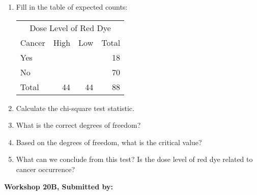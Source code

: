 \documentclass[11pt]{book}\usepackage[]{graphicx}\usepackage[]{color}
\begin{document}
\begin{exercises}
\begin{exercise}
\begin{enumerate}
  \item Fill in the table of expected counts:

\begin{center}
\begin{tabular}{@{} l rrr @{}} \hline
  \multicolumn{4}{c}{Dose Level of Red Dye} \\
Cancer&	High&	Low&	Total \\ \hline
Yes&	&	&	18 \\
No&	&	&	70 \\ \hline
Total&	44&	44&	88 \\ \hline
\end{tabular}
\end{center}

  \item	Calculate the chi-square test statistic.
  \item	What is the correct degrees of freedom?
  \item	Based on the degrees of freedom, what is the critical value?
  \item	What can we conclude from this test? Is the dose level of red dye related to cancer occurrence?
\end{enumerate}

\end{exercise}
\begin{solution}  %

\end{solution}


\clearpage

    \begin{exercise}  %

    \begin{center}
\begin{flushleft}\textbf{\large \hfill Workshop 20B, Submitted by: }\end{flushleft}

\end{center}
\end{exercise}
\end{exercises}
\end{document}
